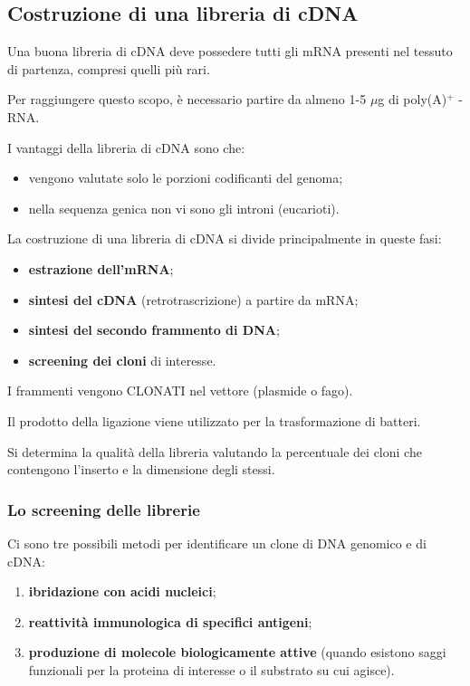 \documentclass[]{article}
\begin{document}
\subsection{Costruzione di una libreria di
cDNA}\label{costruzione-di-una-libreria-di-cdna}

Una buona libreria di cDNA deve possedere tutti gli mRNA presenti nel
tessuto di partenza, compresi quelli più rari.

Per raggiungere questo scopo, è necessario partire da almeno 1-5
\(\mu\)g di poly(A)\(^+\) -RNA.

I vantaggi della libreria di cDNA sono che:

\begin{itemize}
\itemsep1pt\parskip0pt
\item
  vengono valutate solo le porzioni codificanti del genoma;
\item
  nella sequenza genica non vi sono gli introni (eucarioti).
\end{itemize}

La costruzione di una libreria di cDNA si divide principalmente in
queste fasi:

\begin{itemize}
\itemsep1pt\parskip0pt
\item
  \textbf{estrazione dell'mRNA};
\item
  \textbf{sintesi del cDNA} (retrotrascrizione) a partire da mRNA;
\item
  \textbf{sintesi del secondo frammento di DNA};
\item
  \textbf{screening dei cloni} di interesse.
\end{itemize}

I frammenti vengono CLONATI nel vettore (plasmide o fago).

Il prodotto della ligazione viene utilizzato per la trasformazione di
batteri.

Si determina la qualità della libreria valutando la percentuale dei
cloni che contengono l'inserto e la dimensione degli stessi.

\subsubsection{Lo screening delle
librerie}\label{lo-screening-delle-librerie}

Ci sono tre possibili metodi per identificare un clone di DNA genomico e
di cDNA:

\begin{enumerate}
\def\labelenumi{\arabic{enumi}.}
\itemsep1pt\parskip0pt
\item
  \textbf{ibridazione con acidi nucleici};
\item
  \textbf{reattività immunologica di specifici antigeni};
\item
  \textbf{produzione di molecole biologicamente attive} (quando esistono
  saggi funzionali per la proteina di interesse o il substrato su cui
  agisce).
\end{enumerate}
\end{document}
